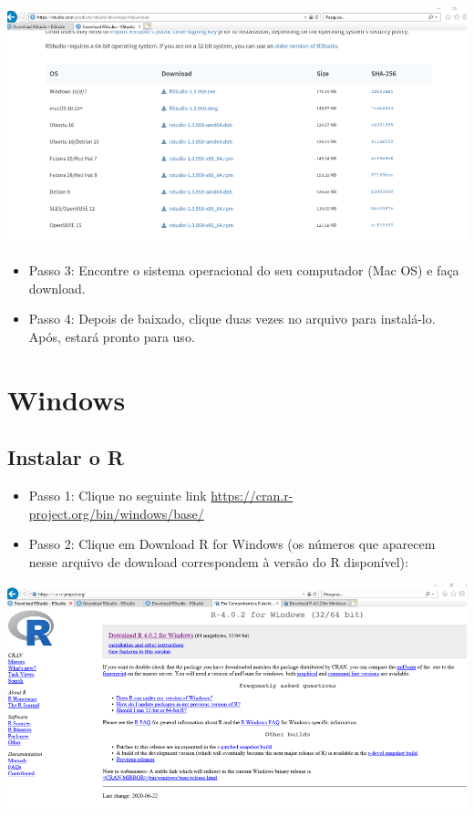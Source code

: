 \documentclass[
]{book}
\providecommand{\tightlist}{%
  \setlength{\itemsep}{0pt}\setlength{\parskip}{0pt}}
\begin{document}
\includegraphics[width=13.54in]{img/inst_1_rstudio}

\begin{itemize}
\tightlist
\item
  Passo 3: Encontre o sistema operacional do seu computador (Mac OS) e faça download.\\
\item
  Passo 4: Depois de baixado, clique duas vezes no arquivo para instalá-lo. Após, estará pronto para uso.
\end{itemize}

\hypertarget{windows}{%
\section{Windows}\label{windows}}

\hypertarget{instalar-o-r-2}{%
\subsection{Instalar o R}\label{instalar-o-r-2}}

\begin{itemize}
\tightlist
\item
  Passo 1: Clique no seguinte link \url{https://cran.r-project.org/bin/windows/base/}\\
\item
  Passo 2: Clique em Download R for Windows (os números que aparecem nesse arquivo de download correspondem à versão do R disponível):
\end{itemize}

\includegraphics[width=13.54in]{img/inst_1_rwindows}
\end{document}
